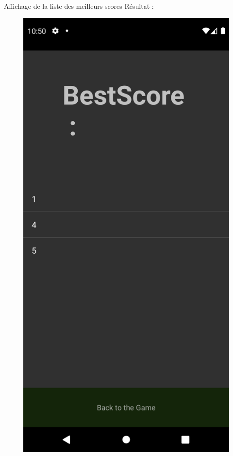 \documentclass{beamer}
\begin{document}
\begin{frame}{Affichage de la liste des meilleurs scores}
Résultat :
    \begin{figure}
        \centering
        \includegraphics[scale=0.08]{LeaderBoard.png}
    \end{figure}
\end{frame}
\end{document}
